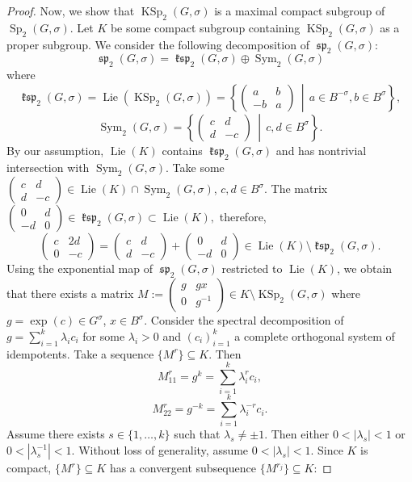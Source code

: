 \documentclass[10pt,a4paper]{amsart}
\DeclareMathOperator{\KSp}{KSp}
\DeclareMathOperator{\Lie}{Lie}
\DeclareMathOperator{\Sp}{Sp}
\DeclareMathOperator{\Sym}{Sym}
\DeclareMathOperator{\ksp}{\mathfrak{ksp}}
\DeclareMathOperator{\spp}{\mathfrak{sp}}
\newcommand{\bs}{\setminus}
\newcommand{\midwd}{\,\middle\vert\,}
\begin{document}
\begin{proof}
Now, we show that $\KSp_2(G,\sigma)$ is a maximal compact subgroup of $\Sp_2(G,\sigma)$. Let $K$ be some compact subgroup containing $\KSp_2(G,\sigma)$ as a proper subgroup. We consider the following decomposition of $\spp_2(G,\sigma)$:
$$\spp_2(G,\sigma)=\ksp_2(G,\sigma)\oplus\Sym_2(G,\sigma)$$
where
$$\ksp_2(G,\sigma)=\Lie(\KSp_2(G,\sigma))=\left\{
\begin{pmatrix}
a & b \\
-b & a
\end{pmatrix}
\midwd a\in B^{-\sigma}, b\in B^{\sigma}
\right\},$$
$$\Sym_2(G,\sigma)=\left\{
\begin{pmatrix}
c & d \\
d & -c
\end{pmatrix}
\midwd c,d\in B^{\sigma}
\right\}.$$
By our assumption, $\Lie(K)$ contains $\ksp_2(G,\sigma)$ and has nontrivial intersection with $\Sym_2(G,\sigma)$. Take some $\begin{pmatrix}
c & d \\
d & -c
\end{pmatrix}\in\Lie(K)\cap\Sym_2(G,\sigma)$, $c,d\in B^{\sigma}$. The matrix
$\begin{pmatrix}
0 & d \\
-d & 0
\end{pmatrix}\in\ksp_2(G,\sigma)\subset\Lie(K),$
therefore,
$$\begin{pmatrix}
c & 2d \\
0 & -c
\end{pmatrix}=\begin{pmatrix}
c & d \\
d & -c
\end{pmatrix}+\begin{pmatrix}
0 & d \\
-d & 0
\end{pmatrix}\in\Lie(K)\bs\ksp_2(G,\sigma).$$
Using the exponential map of $\spp_2(G,\sigma)$ restricted to $\Lie(K)$, we obtain that there exists a matrix $M:=\begin{pmatrix}
g & gx \\
0 & g^{-1}
\end{pmatrix}\in K\bs\KSp_2(G,\sigma)$ where $g=\exp(c)\in G^{\sigma}$, $x\in B^{\sigma}$. Consider the spectral decomposition of $g=\sum_{i=1}^k\lambda_ic_i$ for some $\lambda_i>0$ and $(c_i)_{i=1}^k$ a complete orthogonal system of idempotents. Take a sequence $\{M^r\}\subseteq K$. Then $$M^r_{11}=g^k=\sum_{i=1}^k\lambda_i^rc_i,$$
$$M^r_{22}=g^{-k}=\sum_{i=1}^k\lambda_i^{-r}c_i.$$
Assume there exists $s\in\{1,\dots,k\}$ such that $\lambda_s\neq\pm 1$. Then either $0<|\lambda_s|<1$ or $0<|\lambda_s^{-1}|<1$. Without loss of generality, assume $0<|\lambda_s|<1$. Since $K$ is compact, $\{M^r\}\subseteq K$ has a convergent subsequence $\{M^{r_j}\}\subseteq K$:

\end{proof}
\end{document}
